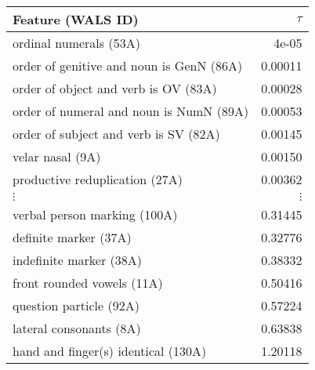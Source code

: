 \begin{tabular}{lr}
Feature (WALS ID) & $\tau$ \\
\hline
ordinal numerals (53A)&4e-05\\
order of genitive and noun is GenN (86A)&0.00011\\
order of object and verb is OV (83A)&0.00028\\
order of numeral and noun is NumN (89A)&0.00053\\
order of subject and verb is SV (82A)&0.00145\\
velar nasal (9A)&0.00150\\
productive reduplication (27A)&0.00362\\
$\vdots$ & $\vdots$ \\
verbal person marking (100A)&0.31445\\
definite marker (37A)&0.32776\\
indefinite marker (38A)&0.38332\\
front rounded vowels (11A)&0.50416\\
question particle (92A)&0.57224\\
lateral consonants (8A)&0.63838\\
hand and finger(s) identical (130A)&1.20118\\
\hline
\end{tabular}
